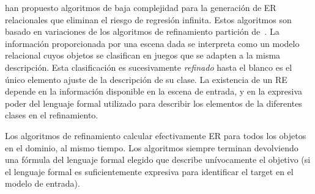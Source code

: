 \cite{arec2:2008:Areces,arec:usin11} han propuesto algoritmos de baja complejidad
 para la generaci\'on de ER relacionales
que eliminan el riesgo de regresi\'on infinita. Estos algoritmos son
basado en variaciones de los algoritmos de refinamiento partici\'on
de~\cite{paig:thre87}. La informaci\'on proporcionada por una escena dada
se interpreta como un modelo relacional cuyos objetos se clasifican en
juegos que se adapten a la misma descripci\'on. Esta clasificaci\'on es
sucesivamente \emph{refinado} hasta el blanco es el \'unico elemento
ajuste de la descripci\'on de su clase. La existencia de un RE depende
en la informaci\'on disponible en la escena de entrada, y en la expresiva
poder del lenguaje formal utilizado para describir los elementos de la
diferentes clases en el refinamiento.


Los algoritmos de refinamiento
calcular efectivamente ER para todos los objetos en el dominio, al mismo
tiempo. Los algoritmos siempre terminan devolviendo una f\'ormula del
lenguaje formal elegido que describe un\'{i}vocamente el objetivo (si el
lenguaje formal es suficientemente expresiva para identificar el target en el
modelo de entrada).



